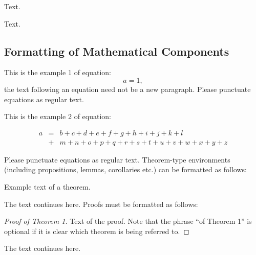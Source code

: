 \begin{paracol}{2}
Text.

Text.

\subsection{Formatting of Mathematical Components}

This is the example 1 of equation:
\begin{equation}
a = 1,
\end{equation}
the text following an equation need not be a new paragraph. Please punctuate equations as regular text.

This is the example 2 of equation:
\end{paracol}
\nointerlineskip
\begin{eqnarray}
a &=& b + c + d + e + f + g + h + i + j + k + l\nonumber \\
 &+& m + n + o + p + q + r + s + t + u + v + w + x + y + z %
\end{eqnarray}






\begin{paracol}{2}
\linenumbers
\switchcolumn
Please punctuate equations as regular text. Theorem-type environments (including propositions, lemmas, corollaries etc.) can be formatted as follows:
\begin{Theorem}
Example text of a theorem.
\end{Theorem}

The text continues here. Proofs must be formatted as follows:

\begin{proof}[Proof of Theorem 1]
Text of the proof. Note that the phrase ``of Theorem 1'' is optional if it is clear which theorem is being referred to.
\end{proof}
The text continues here.

\end{paracol}

